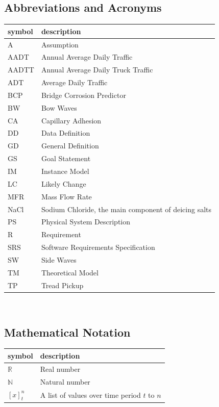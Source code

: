 \documentclass[12pt]{article}
\begin{document}
\subsection{Abbreviations and Acronyms}

\renewcommand{\arraystretch}{1.2}
\begin{tabular}{l l} 
  \toprule		
  \textbf{symbol} & \textbf{description}\\
  \midrule 
A & Assumption\\
AADT & Annual Average Daily Traffic\\
AADTT & Annual Average Daily Truck Traffic\\
ADT & Average Daily Traffic\\
BCP & Bridge Corrosion Predictor \\
BW & Bow Waves\\
CA & Capillary Adhesion\\
DD & Data Definition\\
GD & General Definition\\
GS & Goal Statement\\
IM & Instance Model\\
LC & Likely Change\\
MFR & Mass Flow Rate\\
NaCl & Sodium Chloride, the main component of deicing salts\\
PS & Physical System Description\\
R & Requirement\\
SRS & Software Requirements Specification\\
SW & Side Waves\\
TM & Theoretical Model\\
TP & Tread Pickup\\

  \bottomrule
\end{tabular}\\

\subsection{Mathematical Notation}
\renewcommand{\arraystretch}{1.2}
\begin{tabular}{l l} 
  \toprule		
  \textbf{symbol} & \textbf{description}\\
  \midrule 
  $\mathbb{R}$ & Real number \\
  $\mathbb{N}$ & Natural number \\
  $[x]_t^n$ & A list of values over time period $t$ to $n$ \\

  \bottomrule
\end{tabular}\\
\end{document}
